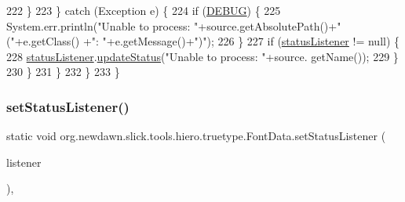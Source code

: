 \begin{DoxyCode}
222                     \}
223                 \} \textcolor{keywordflow}{catch} (Exception e) \{
224                     \textcolor{keywordflow}{if} (\mbox{\hyperlink{classorg_1_1newdawn_1_1slick_1_1tools_1_1hiero_1_1truetype_1_1_font_data_a643b0f56f9565700837fee0d82a1f280}{DEBUG}}) \{
225                         System.err.println(\textcolor{stringliteral}{"Unable to process: "}+source.getAbsolutePath()+\textcolor{stringliteral}{" ("}+e.getClass()
      +\textcolor{stringliteral}{": "}+e.getMessage()+\textcolor{stringliteral}{")"});
226                     \}
227                     \textcolor{keywordflow}{if} (\mbox{\hyperlink{classorg_1_1newdawn_1_1slick_1_1tools_1_1hiero_1_1truetype_1_1_font_data_aa1e117e156dc915030130f6e37336246}{statusListener}} != null) \{
228                         \mbox{\hyperlink{classorg_1_1newdawn_1_1slick_1_1tools_1_1hiero_1_1truetype_1_1_font_data_aa1e117e156dc915030130f6e37336246}{statusListener}}.\mbox{\hyperlink{interfaceorg_1_1newdawn_1_1slick_1_1tools_1_1hiero_1_1truetype_1_1_status_listener_a60c730e33b5466c1801b3e545c8dbd6d}{updateStatus}}(\textcolor{stringliteral}{"Unable to process: "}+source.
      getName());
229                     \}
230                 \}
231             \}
232         \}   
233     \}
\end{DoxyCode}
\mbox{\label{classorg_1_1newdawn_1_1slick_1_1tools_1_1hiero_1_1truetype_1_1_font_data_a37facaa4f1a06c6631a18bf0118e01a2}} 
\subsubsection{\texorpdfstring{set\+Status\+Listener()}{setStatusListener()}}
{\footnotesize\ttfamily static void org.\+newdawn.\+slick.\+tools.\+hiero.\+truetype.\+Font\+Data.\+set\+Status\+Listener (\begin{DoxyParamCaption}\item[{\mbox{\hyperlink{interfaceorg_1_1newdawn_1_1slick_1_1tools_1_1hiero_1_1truetype_1_1_status_listener}{Status\+Listener}}}]{listener }\end{DoxyParamCaption})\hspace{0.3cm}{\ttfamily [inline]}, {\ttfamily [static]}}

